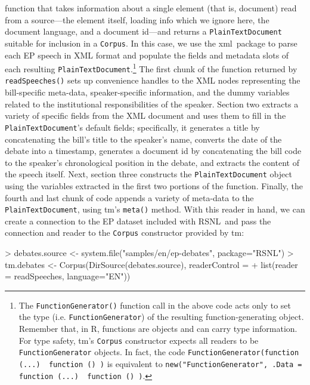 \documentclass[11pt]{article}
\def\R{\textsf{R}}
\def\RSNL{{\normalfont\fontseries{b}\selectfont RSNL}}
\def\tm{{\normalfont\fontseries{b}\selectfont tm}}
\def\xml{{\normalfont\fontseries{b}\selectfont xml}}
\let\code=\texttt
\let\rclass=\texttt
\begin{document}
function that takes information about a single element (that is,
document) read from a source---the element itself, loading info which
we ignore here, the document language, and a document id---and returns
a \rclass{PlainTextDocument} suitable for inclusion in a
\rclass{Corpus}.  In this case, we use the \xml\ package\cite{xml} to
parse each EP speech in XML format and populate the fields and
metadata slots of each resulting
\rclass{PlainTextDocument}.\footnote{The \code{FunctionGenerator()}
function call in the above code acts only to set the type (i.e.
\rclass{FunctionGenerator}) of the resulting function-generating
object.  Remember that, in \R, functions are objects and can carry
type information.  For type safety, \tm's \rclass{Corpus}
constructor expects all readers to be \rclass{FunctionGenerator}
objects.  In fact, the code \code{FunctionGenerator(function (...) {
function () })} is equivalent to \code{new("FunctionGenerator", .Data
= function (...) { function () })}.}  The first chunk of the function
returned by \code{readSpeeches()}
sets up convenience handles to the XML nodes representing the
bill-specific meta-data, speaker-specific information, and the dummy
variables related to the institutional responsibilities of the
speaker.  Section two extracts a variety of specific fields from the
XML document and uses them to fill in the \rclass{PlainTextDocument}'s
default fields; specifically, it generates a title by concatenating
the bill's title to the speaker's name, converts the date of the
debate into a timestamp, generates a document id by concatenating the
bill code to the speaker's chronological position in the debate, and
extracts the content of the speech itself.  Next, section three
constructs the \rclass{PlainTextDocument} object using the variables
extracted in the first two portions of the function.  Finally, the
fourth and last chunk of code appends a variety of meta-data to the
\rclass{PlainTextDocument}, using \tm's \code{meta()} method.  With
this reader in hand, we can create a connection to the EP dataset
included with \RSNL\ and pass the connection and reader to the
\rclass{Corpus} constructor provided by \tm:
\begin{Schunk}
\begin{Sinput}
> debates.source <- system.file("samples/en/ep-debates", package="RSNL")
> tm.debates <- Corpus(DirSource(debates.source), readerControl =
+                      list(reader = readSpeeches, language="EN"))
\end{Sinput}
\end{Schunk}
\end{document}

